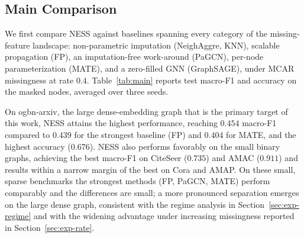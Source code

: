 \subsection{Main Comparison}
\label{sec:exp-main}

We first compare NESS against baselines spanning every category of the missing-feature landscape: non-parametric imputation (NeighAggre, KNN), scalable propagation (FP), an imputation-free work-around (PaGCN), per-node parameterization (MATE), and a zero-filled GNN (GraphSAGE), under MCAR missingness at rate $0.4$. Table~\ref{tab:main} reports test macro-F1 and accuracy on the masked nodes, averaged over three seeds.

On ogbn-arxiv, the large dense-embedding graph that is the primary target of this work, NESS attains the highest performance, reaching $0.454$ macro-F1 compared to $0.439$ for the strongest baseline (FP) and $0.404$ for MATE, and the highest accuracy ($0.676$). NESS also performs favorably on the small binary graphs, achieving the best macro-F1 on CiteSeer ($0.735$) and AMAC ($0.911$) and results within a narrow margin of the best on Cora and AMAP. On these small, sparse benchmarks the strongest methods (FP, PaGCN, MATE) perform comparably and the differences are small; a more pronounced separation emerges on the large dense graph, consistent with the regime analysis in Section~\ref{sec:exp-regime} and with the widening advantage under increasing missingness reported in Section~\ref{sec:exp-rate}.

